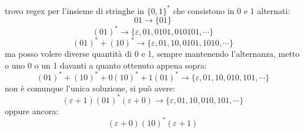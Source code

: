 
\begin{example}
		trovo regex per l'insieme di stringhe in $\{0,1\}^*$ che consistono in 0 e 1 alternati:\\
		$$01\to \{01\}$$
		$$(01)^*\to \{\varepsilon, 01, 0101,010101,\cdots\}$$
		$$(01)^*+(10)^*\to\{\varepsilon, 01,10,0101,1010,\cdots\}$$
		ma posso volere diverse quantità di 0 e 1, sempre mantenendo l'alternanza, metto o uno 0 o un 1 davanti a quanto ottenuto appena sopra:
		$$(01)^*+(10)^*+0(10)^*+1(01)^*\to \{\varepsilon,01,10,010,101,\cdots\}$$
		non è comunque l'unica soluzione, si può avere:
		$$(\varepsilon+1)(01)^*(\varepsilon+0)\to \{\varepsilon,01,10,010,101,\cdots\}$$
		oppure ancora:
		$$(\varepsilon+0)(10)^*(\varepsilon+1)$$
	\end{example}


